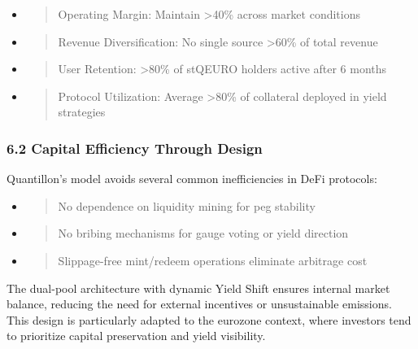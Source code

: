 \begin{itemize}
\item
  \begin{quote}
  Operating Margin: Maintain \textgreater40\% across market conditions
  \end{quote}
\item
  \begin{quote}
  Revenue Diversification: No single source \textgreater60\% of total
  revenue
  \end{quote}
\item
  \begin{quote}
  User Retention: \textgreater80\% of stQEURO holders active after 6
  months
  \end{quote}
\item
  \begin{quote}
  Protocol Utilization: Average \textgreater80\% of collateral deployed
  in yield strategies
  \end{quote}
\end{itemize}

\hypertarget{capital-efficiency-through-design}{%
\subsubsection{6.2 Capital Efficiency Through
Design}\label{capital-efficiency-through-design}}

Quantillon's model avoids several common inefficiencies in DeFi
protocols:

\begin{itemize}
\item
  \begin{quote}
  No dependence on liquidity mining for peg stability
  \end{quote}
\item
  \begin{quote}
  No bribing mechanisms for gauge voting or yield direction
  \end{quote}
\item
  \begin{quote}
  Slippage-free mint/redeem operations eliminate arbitrage cost
  \end{quote}
\end{itemize}

The dual-pool architecture with dynamic Yield Shift ensures internal
market balance, reducing the need for external incentives or
unsustainable emissions. This design is particularly adapted to the
eurozone context, where investors tend to prioritize capital
preservation and yield visibility.

